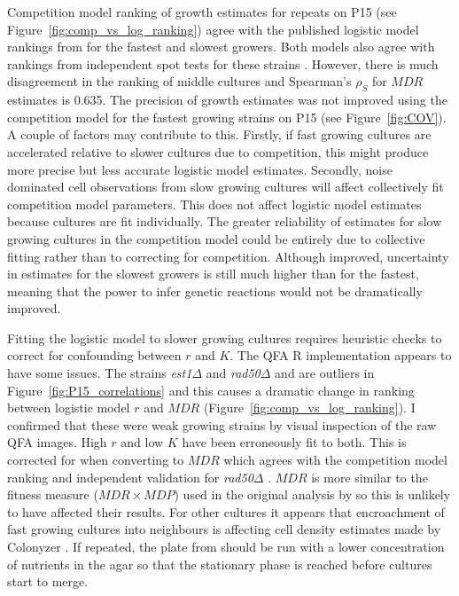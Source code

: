 Competition model ranking of growth estimates for repeats on P15 (see
Figure~\ref{fig:comp_vs_log_ranking}) agree with the published
logistic model rankings from \citet{Addinall2011} for the fastest and
slowest growers. Both models also agree with rankings from independent
spot tests for these strains
\citep{maringele2002exo1,zubko2004exo1,Holstein20141259,foster2006mrx}. However,
there is much disagreement in the ranking of middle cultures and
Spearman's \(\rho_{S}\) for \(MDR\) estimates is 0.635. The precision
of growth estimates was not improved using the competition model for
the fastest growing strains on P15 (see Figure~\ref{fig:COV}). A
couple of factors may contribute to this. Firstly, if fast growing
cultures are accelerated relative to slower cultures due to
competition, this might produce more precise but less accurate
logistic model estimates. Secondly, noise dominated cell observations
from slow growing cultures will affect collectively fit competition
model parameters. This does not affect logistic model estimates
because cultures are fit individually. The greater reliability of
estimates for slow growing cultures in the competition model could be
entirely due to collective fitting rather than to correcting for
competition. Although improved, uncertainty in estimates for the
slowest growers is still much higher than for the fastest, meaning
that the power to infer genetic reactions would not be dramatically
improved.

Fitting the logistic model to slower growing cultures requires
heuristic checks to correct for confounding between \(r\) and
\(K\). The QFA R implementation appears to have some issues. The
strains \textit{est1\(\Delta\)} and \textit{rad50\(\Delta\)} and are
outliers in Figure~\ref{fig:P15_correlations} and this causes a
dramatic change in ranking between logistic model \(r\) and \(MDR\)
(Figure~\ref{fig:comp_vs_log_ranking}). I confirmed that these were
weak growing strains by visual inspection of the raw QFA images. High
\(r\) and low \(K\) have been erroneously fit to both. This is
corrected for when converting to \(MDR\) which agrees with the
competition model ranking and independent validation for
\textit{rad50\(\Delta\)} \citep{zubko2004exo1}. \(MDR\) is more
similar to the fitness measure (\(MDR \times MDP\)) used in the
original analysis by \citet{Addinall2011} so this is unlikely to have
affected their results. For other cultures it appears that
encroachment of fast growing cultures into neighbours is affecting
cell density estimates made by Colonyzer \citep{Lawless2010}. If
repeated, the plate from \citet{Addinall2011} should be run with a
lower concentration of nutrients in the agar so that the stationary
phase is reached before cultures start to merge.

